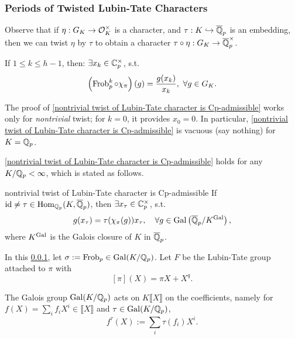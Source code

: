 \subsubsection{Periods of Twisted Lubin-Tate Characters}\label{subsubsec: Periods of Twisted Lubin-Tate Characters}
Observe that if $\eta : G_K\to\mathcal{O}_K^\times$ is a character, and $\tau : K\hookrightarrow \overline{\mathbb{Q}}_p$
is an embedding, then we can twist $\eta$ by $\tau$ to obtain a character $\tau\circ\eta : G_K\to\overline{\mathbb{Q}}_p^\times$.
\begin{theorem}\label{nontrivial twist of Lubin-Tate character is Cp-admissible}
    If $1\le k\le h - 1$,
    then: $\exists x_k\in\mathbb{C}_p^\times$, s.t.
    \[\left( \operatorname{Frob}_p^k\circ\chi_\pi \right)(g) = \frac{g(x_k )}{x_k },\ \forall g\in G_K.\]
\end{theorem}

\begin{remark}
    The proof of \cref{nontrivial twist of Lubin-Tate character is Cp-admissible}
    works only for \textit{nontrivial} twist;
    for $k = 0$, it provides $x_0 = 0$.
    In particular, \cref{nontrivial twist of Lubin-Tate character is Cp-admissible}
    is vacuous (say nothing) for $K = \mathbb{Q}_p$.
\end{remark}
\begin{remark}
    \cref{nontrivial twist of Lubin-Tate character is Cp-admissible} holds for any $K/\mathbb{Q}_p < \infty$, which is stated as follows.
\end{remark}
\begin{theoremprime}
    {nontrivial twist of Lubin-Tate character is Cp-admissible}
    If $\operatorname{id}\ne \tau\in\mathop{\mathrm{Hom}}_{\mathbb{Q}_p}(K, \overline{\mathbb{Q}}_p)$,
    then $\exists x_\tau\in \mathbb{C}_p^\times$,
    s.t. \[g(x_\tau) = \tau(\chi_\pi(g))x_\tau,\quad \forall g\in\operatorname{Gal}\left(\overline{\mathbb{Q}}_p / K^{\operatorname{Gal}}\right),\]
    where $K^{\operatorname{Gal}}$ is the Galois closure of $K$ in $\overline{\mathbb{Q}}_p$.
\end{theoremprime}
    


In this \cref{subsubsec: Periods of Twisted Lubin-Tate Characters}, let $\sigma := \operatorname{Frob}_p\in\operatorname{Gal}(K/\mathbb{Q}_p)$.
Let $F$ be the Lubin-Tate group attached to $\pi$ with \[[\pi](X) = \pi X + X^q.\]

The Galois group $\operatorname{Gal}(K/\mathbb{Q}_p)$ acts on $K\llbracket X \rrbracket$ on the coefficients, namely for $f(X) = \sum_{i} f_iX^i\in\llbracket X \rrbracket$ and $\tau\in\operatorname{Gal}(K/\mathbb{Q}_p)$,
\[ f^\tau(X) := \sum_i \tau(f_i) X^i.\]

